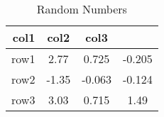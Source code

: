 \begin{table}[htpb!]
\centering
\begin{tabular}{r|ccc}
col1 & col2 & col3\\\hline\hline
row1 & 2.77 & 0.725 & -0.205\\
row2 & -1.35 & -0.063 & -0.124\\
row3 & 3.03 & 0.715 & 1.49\\
\hline
\end{tabular}
\caption{Random Numbers}
\end{table}


